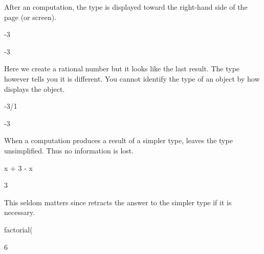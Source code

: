 \begin{xtc}
\begin{xtccomment}
After an \Language{} computation, the type is displayed toward the
right-hand side of the page (or screen).
\end{xtccomment}
\begin{spadsrc}
-3
\end{spadsrc}
\begin{TeXOutput}
\begin{fricasmath}{1}
-{3}%
\end{fricasmath}
\end{TeXOutput}
\end{xtc}
\begin{xtc}
\begin{xtccomment}
Here we create a rational number but it looks like the last result.
The type however tells you it is different.
You cannot identify the type of an object by how \Language{}
displays the object.
\end{xtccomment}
\begin{spadsrc}
-3/1
\end{spadsrc}
\begin{TeXOutput}
\begin{fricasmath}{2}
-{3}%
\end{fricasmath}
\end{TeXOutput}
\end{xtc}
\begin{xtc}
\begin{xtccomment}
When a computation produces a result of a simpler type, \Language{} leaves
the type unsimplified.
Thus no information is lost.
\end{xtccomment}
\begin{spadsrc}
x + 3 - x 
\end{spadsrc}
\begin{TeXOutput}
\begin{fricasmath}{3}
3%
\end{fricasmath}
\end{TeXOutput}
\end{xtc}
\begin{xtc}
\begin{xtccomment}
This seldom matters since \Language{} retracts the answer to the
simpler type if it is necessary.
\end{xtccomment}
\begin{spadsrc}
factorial(%
\end{spadsrc}
\begin{TeXOutput}
\begin{fricasmath}{4}
6%
\end{fricasmath}
\end{TeXOutput}
\end{xtc}
